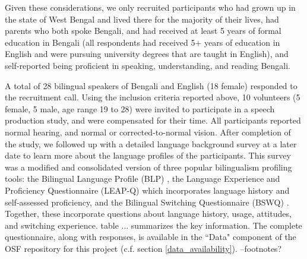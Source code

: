 \documentclass[12 pt]{article}
\begin{document}
Given these considerations, we only recruited participants who had grown up in the state of West Bengal and lived there for the majority of their lives, had parents who both spoke Bengali, and had received at least 5 years of formal education in Bengali (all respondents had received 5+ years of education in English and were pursuing university degrees that are taught in English), and self-reported being proficient in speaking, understanding, and reading Bengali. 

A total of 28 bilingual speakers of Bengali and English (18 female) responded to the recruitment call. Using the inclusion criteria reported above, 10 volunteers (5 female, 5 male, age range 19 to 28) were invited to participate in a speech production study, and were compensated for their time. All participants reported normal hearing, and normal or corrected-to-normal vision. After completion of the study, we followed up with a detailed language background survey at a later date to learn more about the language profiles of the participants. This survey was a modified and consolidated version of three popular bilingualism profiling tools: the Bilingual Language Profile (BLP) \citep{blp}, the Language Experience and Proficiency Questionnaire (LEAP-Q) \citep{leap-q} which incorporates language history and self-assessed proficiency, and the Bilingual Switching Questionnaire (BSWQ) \citep{language_switching_questionnaire}. Together, these incorporate questions about language history, usage, attitudes, and switching experience. \alert{table ... summarizes the key information. The complete questionnaire, along with responses, is available in the ``Data" component of the OSF repository for this project (c.f. section \ref{data_availability}). --footnotes?}
\end{document}
